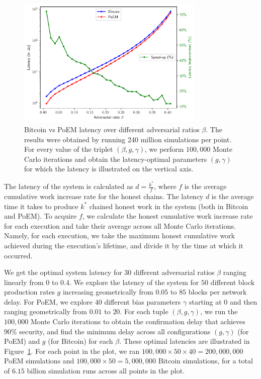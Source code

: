 \begin{figure}[h]
    \centering
    \includegraphics[width = 0.8\textwidth]{figures/bitcoin_vs_poem.pdf}

    \caption{Bitcoin vs PoEM latency over different adversarial ratios $\beta$.
             The results were obtained by running 240 million simulations per point.
             For every value of the triplet $(\beta, g, \gamma)$, we perform
             $100{,}000$ Monte Carlo iterations and obtain the latency-optimal parameters
             $(g, \gamma)$ for which the latency is illustrated on the vertical axis.}
    \label{fig:bitcoin_vs_poem}
\end{figure}

The latency of the system is calculated as $d = \frac{k^*}{f}$, where $f$ is the average cumulative work increase rate for the honest chains.
The latency $d$ is the average time it takes to produce $k^*$ chained honest work in the system (both in Bitcoin and PoEM).
To acquire $f$, we calculate the honest cumulative work increase rate for each execution and take their average across all Monte Carlo iterations.
Namely, for each execution, we take the maximum honest cumulative work achieved during the execution's lifetime, and divide it by the time
at which it occurred.

We get the optimal system latency for $30$ different adversarial ratios $\beta$ ranging linearly from $0$ to $0.4$.
We explore the latency of the system for $50$ different block production rates $g$ increasing geometrically from $0.05$ to $85$ blocks per network delay.
For PoEM, we explore $40$ different bias parameters $\gamma$ starting at $0$ and then ranging geometrically from $0.01$ to $20$.
For each tuple $(\beta, g, \gamma)$, we run the $100{,}000$ Monte Carlo iterations to obtain the
confirmation delay that achieves $90\%$ security, and find the minimum delay across all configurations $(g, \gamma)$ (for PoEM)
and $g$ (for Bitcoin) for each $\beta$.
These optimal latencies are illustrated in Figure~\ref{fig:bitcoin_vs_poem}.
For each point in the plot, we ran $100{,}000 \times 50 \times 40 = 200{,}000{,}000$ PoEM simulations
and $100{,}000 \times 50 = 5{,}000{,}000$ Bitcoin simulations,
for a total of $6.15$ billion simulation runs across all points in the plot.

